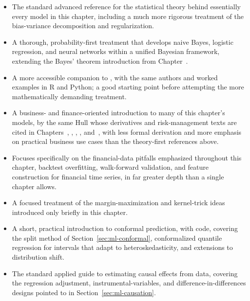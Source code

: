 \documentclass[../ai_in_finance]{subfiles}
\begin{document}

\begin{itemize}
    \item {} The standard advanced reference for the statistical theory behind essentially every model in this chapter, including a much more rigorous treatment of the bias-variance decomposition and regularization.
    \item {} A thorough, probability-first treatment that develops naive Bayes, logistic regression, and neural networks within a unified Bayesian framework, extending the Bayes' theorem introduction from Chapter~.
    \item {} A more accessible companion to \textcite{hastie2009elements}, with the same authors and worked examples in R and Python; a good starting point before attempting the more mathematically demanding treatment.
    \item {} A business- and finance-oriented introduction to many of this chapter's models, by the same Hull whose derivatives and risk-management texts are cited in Chapters~, , , , and~, with less formal derivation and more emphasis on practical business use cases than the theory-first references above.
    \item {} Focuses specifically on the financial-data pitfalls emphasized throughout this chapter, backtest overfitting, walk-forward validation, and feature construction for financial time series, in far greater depth than a single chapter allows.
    \item {} A focused treatment of the margin-maximization and kernel-trick ideas introduced only briefly in this chapter.
    \item {} A short, practical introduction to conformal prediction, with code, covering the split method of Section~\ref{sec:ml-conformal}, conformalized quantile regression for intervals that adapt to heteroskedasticity, and extensions to distribution shift.
    \item {} The standard applied guide to estimating causal effects from data, covering the regression adjustment, instrumental-variables, and difference-in-differences designs pointed to in Section~\ref{sec:ml-causation}.
\end{itemize}
\end{document}
